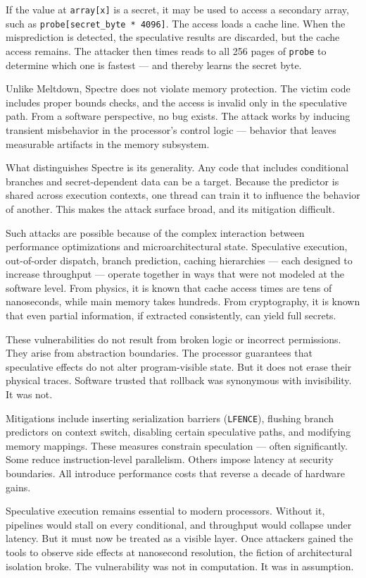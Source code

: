 If the value at \texttt{array[x]} is a secret, it may be used to access a secondary array, such as \texttt{probe[secret\_byte * 4096]}. The access loads a cache line. When the misprediction is detected, the speculative results are discarded, but the cache access remains. The attacker then times reads to all 256 pages of \texttt{probe} to determine which one is fastest — and thereby learns the secret byte.

Unlike Meltdown, Spectre does not violate memory protection. The victim code includes proper bounds checks, and the access is invalid only in the speculative path. From a software perspective, no bug exists. The attack works by inducing transient misbehavior in the processor’s control logic — behavior that leaves measurable artifacts in the memory subsystem.

What distinguishes Spectre is its generality. Any code that includes conditional branches and secret-dependent data can be a target. Because the predictor is shared across execution contexts, one thread can train it to influence the behavior of another. This makes the attack surface broad, and its mitigation difficult.

Such attacks are possible because of the complex interaction between performance optimizations and microarchitectural state. Speculative execution, out-of-order dispatch, branch prediction, caching hierarchies — each designed to increase throughput — operate together in ways that were not modeled at the software level. From physics, it is known that cache access times are tens of nanoseconds, while main memory takes hundreds. From cryptography, it is known that even partial information, if extracted consistently, can yield full secrets.

These vulnerabilities do not result from broken logic or incorrect permissions. They arise from abstraction boundaries. The processor guarantees that speculative effects do not alter program-visible state. But it does not erase their physical traces. Software trusted that rollback was synonymous with invisibility. It was not.

Mitigations include inserting serialization barriers (\texttt{LFENCE}), flushing branch predictors on context switch, disabling certain speculative paths, and modifying memory mappings. These measures constrain speculation — often significantly. Some reduce instruction-level parallelism. Others impose latency at security boundaries. All introduce performance costs that reverse a decade of hardware gains.

Speculative execution remains essential to modern processors. Without it, pipelines would stall on every conditional, and throughput would collapse under latency. But it must now be treated as a visible layer. Once attackers gained the tools to observe side effects at nanosecond resolution, the fiction of architectural isolation broke. The vulnerability was not in computation. It was in assumption.

\clearpage